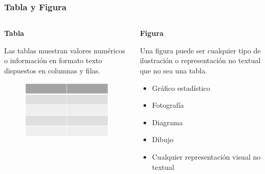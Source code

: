 \documentclass[
11pt, %
]{beamer}
\begin{document}
\begin{frame}
	\frametitle{Tabla y Figura}

	\begin{columns}[c] %
		\begin{column}{0.5\textwidth} %
			\textbf{Tabla}

			Las tablas muestran valores numéricos o información en formato texto dispuestos
			en columnas y filas.
			\begin{figure}[H]
				\centering
				\includegraphics[width=1\linewidth]{images/screenshot001}
			\end{figure}
		\end{column}
		\begin{column}{0.5\textwidth} %
			\textbf{Figura}

			Una figura puede ser cualquier tipo de ilustración o representación no textual
			que no sea una tabla.
			\begin{itemize}
				\item Gráfico estadístico
				\item Fotografía
				\item Diagrama
				\item Dibujo
				\item Cualquier representación visual no textual
			\end{itemize}
		\end{column}
	\end{columns}

\end{frame}
\end{document}
